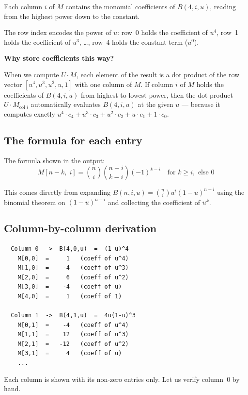 \documentclass[12pt, a4paper]{article}
\begin{document}
Each column $i$ of $M$ contains the monomial coefficients
of $B(4, i, u)$, reading from the highest power down to the constant.

The row index encodes the power of $u$:
row~0 holds the coefficient of $u^4$,
row~1 holds the coefficient of $u^3$, \ldots,
row~4 holds the constant term ($u^0$).

\begin{examplebox}
\textbf{Why store coefficients this way?}

When we compute $U \cdot M$, each element of the result is
a dot product of the row vector $[u^4, u^3, u^2, u, 1]$
with one column of $M$.
If column $i$ of $M$ holds the coefficients of $B(4,i,u)$
from highest to lowest power, then the dot product
$U \cdot M_{\text{col } i}$ automatically evaluates
$B(4,i,u)$ at the given $u$ --- because it computes
exactly $u^4 \cdot c_4 + u^3 \cdot c_3 + u^2 \cdot c_2
+ u \cdot c_1 + 1 \cdot c_0$.
\end{examplebox}

\subsection{The formula for each entry}

The formula shown in the output:
\[
  M[n-k,\; i] = \binom{n}{i} \binom{n-i}{k-i} (-1)^{k-i}
  \quad \text{for } k \geq i, \text{ else } 0
\]

This comes directly from expanding
$B(n,i,u) = \binom{n}{i} u^i (1-u)^{n-i}$
using the binomial theorem on $(1-u)^{n-i}$
and collecting the coefficient of $u^k$.

\subsection{Column-by-column derivation}

\begin{verbatim}
  Column 0  ->  B(4,0,u)  =  (1-u)^4
    M[0,0]  =     1   (coeff of u^4)
    M[1,0]  =    -4   (coeff of u^3)
    M[2,0]  =     6   (coeff of u^2)
    M[3,0]  =    -4   (coeff of u)
    M[4,0]  =     1   (coeff of 1)

  Column 1  ->  B(4,1,u)  =  4u(1-u)^3
    M[0,1]  =    -4   (coeff of u^4)
    M[1,1]  =    12   (coeff of u^3)
    M[2,1]  =   -12   (coeff of u^2)
    M[3,1]  =     4   (coeff of u)
    ...
\end{verbatim}

Each column is shown with its non-zero entries only.
Let us verify column~0 by hand.
\end{document}
